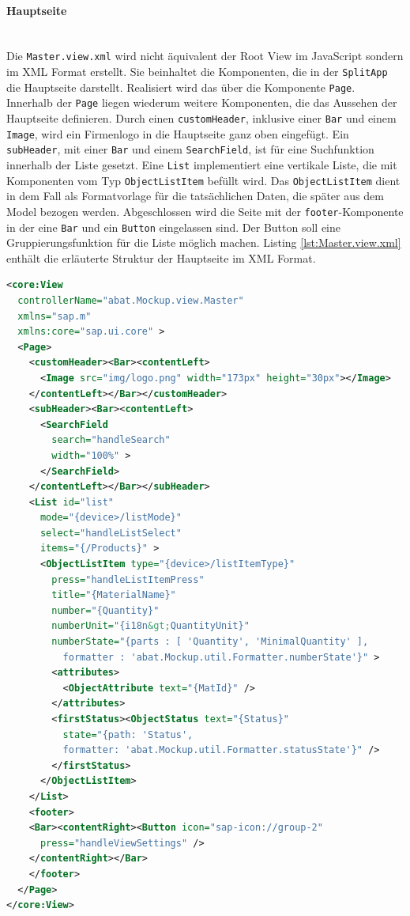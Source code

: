 \paragraph{Hauptseite}$\;$ \\
Die \texttt{Master.view.xml} wird nicht äquivalent der Root View im JavaScript sondern im XML Format erstellt. Sie beinhaltet die Komponenten, die in der \texttt{SplitApp} die Hauptseite darstellt. Realisiert wird das über die Komponente \texttt{Page}. Innerhalb der \texttt{Page} liegen wiederum weitere Komponenten, die das Aussehen der Hauptseite definieren. Durch einen \texttt{customHeader}, inklusive einer \texttt{Bar} und einem \texttt{Image}, wird ein Firmenlogo in die Hauptseite ganz oben eingefügt. Ein \texttt{subHeader}, mit einer \texttt{Bar} und einem \texttt{SearchField}, ist für eine Suchfunktion innerhalb der Liste gesetzt. Eine \texttt{List} implementiert eine vertikale Liste, die mit Komponenten vom Typ \texttt{ObjectListItem} befüllt wird. Das \texttt{ObjectListItem} dient in dem Fall als Formatvorlage für die tatsächlichen Daten, die später aus dem Model bezogen werden. Abgeschlossen wird die Seite mit der \texttt{footer}-Komponente in der eine \texttt{Bar} und ein \texttt{Button} eingelassen sind. Der Button soll eine Gruppierungsfunktion für die Liste möglich machen. Listing \ref{lst:Master.view.xml} enthält die erläuterte Struktur der Hauptseite im XML Format.

\vspace{1em}
\begin{lstlisting}[language=XML, caption=Hauptseite der SplitApp, label=lst:Master.view.xml]
<core:View
  controllerName="abat.Mockup.view.Master"
  xmlns="sap.m"
  xmlns:core="sap.ui.core" >
  <Page>
    <customHeader><Bar><contentLeft>
      <Image src="img/logo.png" width="173px" height="30px"></Image>
    </contentLeft></Bar></customHeader>
    <subHeader><Bar><contentLeft>
      <SearchField
        search="handleSearch"
        width="100%" >
      </SearchField>
    </contentLeft></Bar></subHeader>
    <List id="list"
      mode="{device>/listMode}"
      select="handleListSelect"
      items="{/Products}" >
      <ObjectListItem type="{device>/listItemType}"
        press="handleListItemPress"
        title="{MaterialName}"
        number="{Quantity}"
        numberUnit="{i18n&gt;QuantityUnit}"
        numberState="{parts : [ 'Quantity', 'MinimalQuantity' ],
          formatter : 'abat.Mockup.util.Formatter.numberState'}" >
        <attributes>
          <ObjectAttribute text="{MatId}" />
        </attributes>
        <firstStatus><ObjectStatus text="{Status}"
          state="{path: 'Status',
          formatter: 'abat.Mockup.util.Formatter.statusState'}" />
        </firstStatus>
      </ObjectListItem>
    </List>
    <footer>
    <Bar><contentRight><Button icon="sap-icon://group-2"
      press="handleViewSettings" />
    </contentRight></Bar>
    </footer>
  </Page>
</core:View>
\end{lstlisting}

